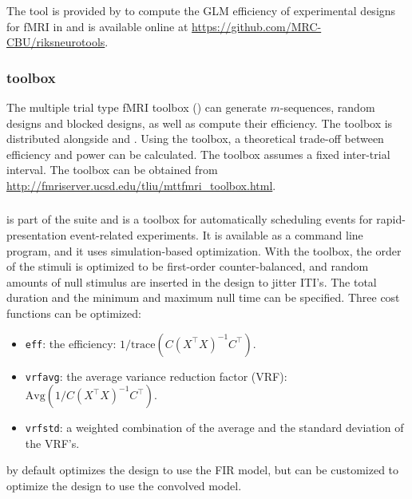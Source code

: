 \documentclass[article]{jss}
\begin{document}
\subsubsection[riksneurotools]{}
The tool  is provided by \citet{Henson2006} to
compute the GLM efficiency of experimental designs for fMRI in
 and is available online at
\url{https://github.com/MRC-CBU/riksneurotools}.

\subsubsection[mttfmri toolbox]{ toolbox}
The multiple trial type fMRI  toolbox () can generate
$m$-sequences, random designs and blocked designs, as well as compute
their efficiency.  The toolbox is distributed alongside
\citet{Liu2004b} and \citet{Liu2004a}.  Using the toolbox, a
theoretical trade-off between efficiency and power can be calculated.
The toolbox assumes a fixed inter-trial interval.  The toolbox can be
obtained from
\url{http://fmriserver.ucsd.edu/tliu/mttfmri_toolbox.html}.

\subsubsection[Optseq2]{}
 is part of the  suite
\citep{Dale1999-ik} and is a  toolbox for automatically
scheduling events for rapid-presentation event-related experiments.
It is available as a command line program, and it uses
simulation-based optimization.  With the toolbox, the order of the
stimuli is optimized to be first-order counter-balanced, and random
amounts of null stimulus are inserted in the design to jitter ITI's.
The total duration and the minimum and maximum null time can be
specified.  Three cost functions can be optimized:%
\begin{itemize}
\item \texttt{eff}: the efficiency: $1/\text{trace}(C(X^\top X)^{-1}C^\top)$.
\item \texttt{vrfavg}: the average variance reduction factor (VRF): $\text{Avg}(1/C(X^\top X)^{-1}C^\top)$.
\item \texttt{vrfstd}: a weighted combination of the average and the standard deviation of the VRF's.
\end{itemize}

 by default optimizes the design to use the FIR model, but can be customized to optimize the design to use the convolved model.
\end{document}
